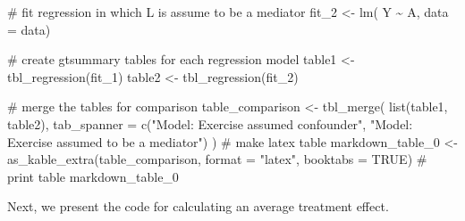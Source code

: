 \documentclass[
  singlecolumn]{article}
\newenvironment{Shaded}{\begin{snugshade}}{\end{snugshade}}
\newcommand{\AttributeTok}[1]{\textcolor[rgb]{0.40,0.45,0.13}{#1}}
\newcommand{\CommentTok}[1]{\textcolor[rgb]{0.37,0.37,0.37}{#1}}
\newcommand{\ConstantTok}[1]{\textcolor[rgb]{0.56,0.35,0.01}{#1}}
\newcommand{\FunctionTok}[1]{\textcolor[rgb]{0.28,0.35,0.67}{#1}}
\newcommand{\NormalTok}[1]{\textcolor[rgb]{0.00,0.23,0.31}{#1}}
\newcommand{\OtherTok}[1]{\textcolor[rgb]{0.00,0.23,0.31}{#1}}
\newcommand{\SpecialCharTok}[1]{\textcolor[rgb]{0.37,0.37,0.37}{#1}}
\newcommand{\StringTok}[1]{\textcolor[rgb]{0.13,0.47,0.30}{#1}}
\begin{document}
\begin{Shaded}
\begin{Highlighting}[]
\CommentTok{\# fit regression in which L is assume to be a mediator}
\NormalTok{fit\_2 }\OtherTok{\textless{}{-}} \FunctionTok{lm}\NormalTok{( Y }\SpecialCharTok{\textasciitilde{}}\NormalTok{ A, }\AttributeTok{data =}\NormalTok{ data)}

\CommentTok{\# create gtsummary tables for each regression model}
\NormalTok{table1 }\OtherTok{\textless{}{-}} \FunctionTok{tbl\_regression}\NormalTok{(fit\_1)}
\NormalTok{table2 }\OtherTok{\textless{}{-}} \FunctionTok{tbl\_regression}\NormalTok{(fit\_2)}

\CommentTok{\# merge the tables for comparison}
\NormalTok{table\_comparison }\OtherTok{\textless{}{-}} \FunctionTok{tbl\_merge}\NormalTok{(}
  \FunctionTok{list}\NormalTok{(table1, table2),}
  \AttributeTok{tab\_spanner =} \FunctionTok{c}\NormalTok{(}\StringTok{"Model: Exercise assumed confounder"}\NormalTok{, }
                  \StringTok{"Model: Exercise assumed to be a mediator"}\NormalTok{)}
\NormalTok{)}
\CommentTok{\# make latex table}
\NormalTok{markdown\_table\_0 }\OtherTok{\textless{}{-}} \FunctionTok{as\_kable\_extra}\NormalTok{(table\_comparison, }
                                   \AttributeTok{format =} \StringTok{"latex"}\NormalTok{, }
                                   \AttributeTok{booktabs =} \ConstantTok{TRUE}\NormalTok{)}
\CommentTok{\# print table}
\NormalTok{markdown\_table\_0}
\end{Highlighting}
\end{Shaded}

Next, we present the code for calculating an average treatment effect.
\end{document}
